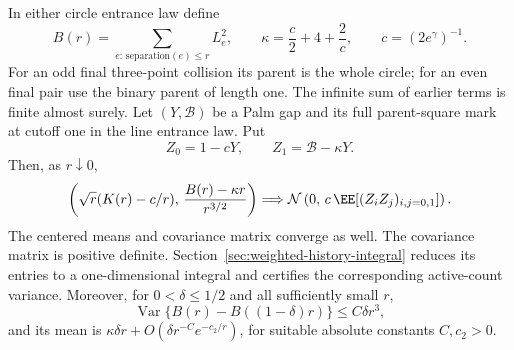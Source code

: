 \documentclass[11pt,letterpaper]{article}
\begin{document}
\begin{theorem}
\label{thm:entrance-parent-square-CLT}
In either circle entrance law define
\[
 B(r)=\sum_{e:\,\text{separation}(e)\le r}L_e^2,
 \qquad \kappa=\frac c2+4+\frac2c,
 \qquad c=(2e^\gamma)^{-1}.
\]
For an odd final three-point collision its parent is the whole
circle; for an even final pair use the binary parent of length
one. The infinite sum of earlier terms is finite almost surely.
Let $(Y,\mathcal B)$ be a Palm gap and its full parent-square
mark at cutoff one in the line entrance law. Put
\[
 Z_0=1-cY,\qquad Z_1=\mathcal B-\kappa Y.
\]
Then, as $r\downarrow0$,
\begin{equation}\label{eq:parent-square-joint-CLT}
 \left(\sqrt r(K(r)-c/r),\,
              \frac{B(r)-\kappa r}{r^{3/2}}\right)
       \Longrightarrow\mathcal N\left(0,\,
                     c\,\EE[(Z_iZ_j)_{i,j=0,1}]\right).
\end{equation}
The centered means and covariance matrix converge as well.
The covariance matrix is positive definite.
Section~\ref{sec:weighted-history-integral} reduces its entries
to a one-dimensional integral and certifies the corresponding
active-count variance.
Moreover, for $0<\delta\le1/2$ and all sufficiently small $r$,
\begin{equation}\label{eq:parent-square-short-band-variance}
 \operatorname{Var}\{B(r)-B((1-\delta)r)\}\le C\delta r^3,
\end{equation}
and its mean is $\kappa\delta r+O(\delta r^{-C}e^{-c_2/r})$,
for suitable absolute constants $C,c_2>0$.
\end{theorem}
\end{document}
